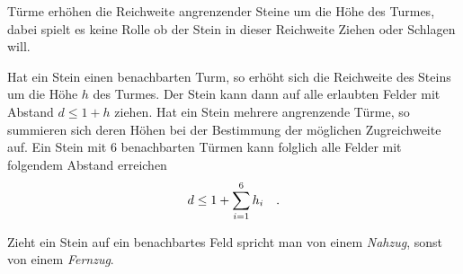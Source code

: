 \bigskip

Türme erhöhen die Reichweite angrenzender Steine um die Höhe des Turmes, dabei spielt es keine Rolle ob der Stein in dieser Reichweite Ziehen oder Schlagen will.

Hat ein Stein einen benachbarten Turm, so erhöht sich die Reichweite des Steins um die Höhe $h$ des Turmes. Der Stein kann dann auf alle erlaubten Felder mit Abstand $d \le 1 + h$ ziehen. Hat ein Stein mehrere angrenzende Türme, so summieren sich deren Höhen bei der Bestimmung der möglichen Zugreichweite auf. Ein Stein mit $6$ benachbarten Türmen kann folglich alle Felder mit folgendem Abstand erreichen \[d \le 1 + \sum_{i=1}^6 h_i\hspace*{10pt}.\]

Zieht ein Stein auf ein benachbartes Feld spricht man von einem \emph{Nahzug}, sonst von einem \emph{Fernzug}.

